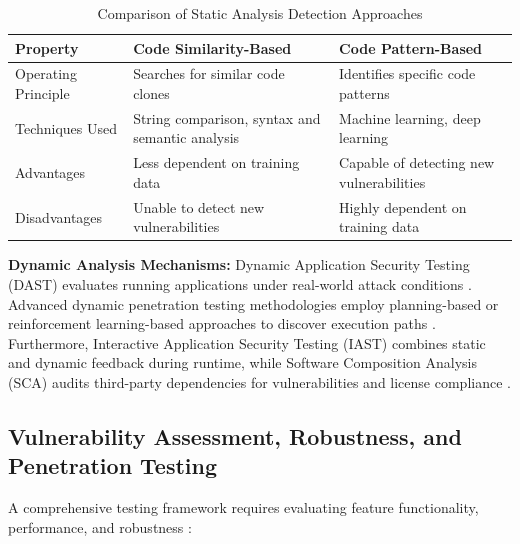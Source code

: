 \begin{table}[htbp]
	\caption{Comparison of Static Analysis Detection Approaches \cite[p. 3, 8]{cong2024overview}}
	\label{tab:static_analysis_comparison}
	\centering
	\begin{tabularx}{\textwidth}{l X X}
			\toprule
			\textbf{Property} & \textbf{Code Similarity-Based} & \textbf{Code Pattern-Based} \\
			\midrule
			Operating Principle & Searches for similar code clones & Identifies specific code patterns \\ \addlinespace
			Techniques Used & String comparison, syntax and semantic analysis & Machine learning, deep learning \\ \addlinespace
			Advantages & Less dependent on training data & Capable of detecting new vulnerabilities \\ \addlinespace
			Disadvantages & Unable to detect new vulnerabilities & Highly dependent on training data \\
			\bottomrule
		\end{tabularx}
\end{table}

\textbf{Dynamic Analysis Mechanisms:} Dynamic Application Security Testing (DAST) evaluates running applications under real-world attack conditions \cite{GeeksforGeeksSecurityTesting}. Advanced dynamic penetration testing methodologies employ planning-based or reinforcement learning-based approaches to discover execution paths \cite[p. 6]{cong2024overview}. Furthermore, Interactive Application Security Testing (IAST) combines static and dynamic feedback during runtime, while Software Composition Analysis (SCA) audits third-party dependencies for vulnerabilities and license compliance \cite{GeeksforGeeksSecurityTesting}.




\subsection{Vulnerability Assessment, Robustness, and Penetration Testing}
\label{subsec:vulnerabilities_fuzzing_pentesting}


A comprehensive testing framework requires evaluating feature functionality, performance, and robustness \cite[p. 48]{richier2011security}:

